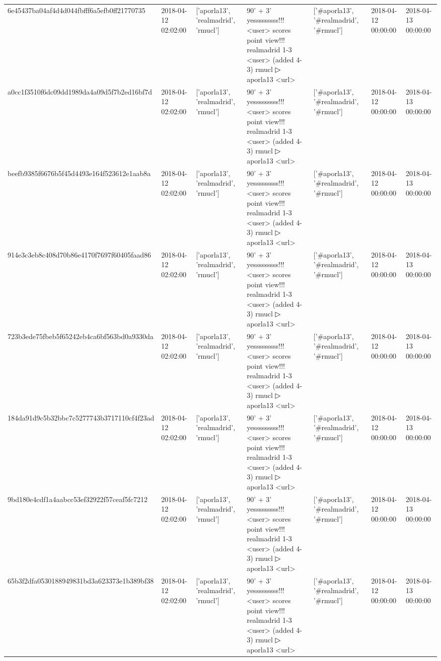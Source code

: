 \begin{tabular}{lllllll}
6e45437ba04af4d4d044fbfff6a5efb0ff21770735 & 2018-04-12 02:02:00 & ['aporla13', 'realmadrid', 'rmucl'] & 90' + 3' yesssssssss!!! <user> scores point view!!! realmadrid 1-3 <user> (added 4-3) rmucl ▷ aporla13 <url> & ['#aporla13', '#realmadrid', '#rmucl'] & 2018-04-12 00:00:00 & 2018-04-13 00:00:00 \\
a0cc1f3510f6dc09dd1989da4a09d5f7b2ed16bf7d & 2018-04-12 02:02:00 & ['aporla13', 'realmadrid', 'rmucl'] & 90' + 3' yesssssssss!!! <user> scores point view!!! realmadrid 1-3 <user> (added 4-3) rmucl ▷ aporla13 <url> & ['#aporla13', '#realmadrid', '#rmucl'] & 2018-04-12 00:00:00 & 2018-04-13 00:00:00 \\
beefb9385f6676b5f45d4493e164f523612e1aab8a & 2018-04-12 02:02:00 & ['aporla13', 'realmadrid', 'rmucl'] & 90' + 3' yesssssssss!!! <user> scores point view!!! realmadrid 1-3 <user> (added 4-3) rmucl ▷ aporla13 <url> & ['#aporla13', '#realmadrid', '#rmucl'] & 2018-04-12 00:00:00 & 2018-04-13 00:00:00 \\
914e3c3eb8c408d70b86e4170f7697f60405faad86 & 2018-04-12 02:02:00 & ['aporla13', 'realmadrid', 'rmucl'] & 90' + 3' yesssssssss!!! <user> scores point view!!! realmadrid 1-3 <user> (added 4-3) rmucl ▷ aporla13 <url> & ['#aporla13', '#realmadrid', '#rmucl'] & 2018-04-12 00:00:00 & 2018-04-13 00:00:00 \\
723b3ede75fbeb5f65242eb4ca6bf563bd0a9330da & 2018-04-12 02:02:00 & ['aporla13', 'realmadrid', 'rmucl'] & 90' + 3' yesssssssss!!! <user> scores point view!!! realmadrid 1-3 <user> (added 4-3) rmucl ▷ aporla13 <url> & ['#aporla13', '#realmadrid', '#rmucl'] & 2018-04-12 00:00:00 & 2018-04-13 00:00:00 \\
184da91d9c5b32bbc7c5277743b3717110cf4f23ad & 2018-04-12 02:02:00 & ['aporla13', 'realmadrid', 'rmucl'] & 90' + 3' yesssssssss!!! <user> scores point view!!! realmadrid 1-3 <user> (added 4-3) rmucl ▷ aporla13 <url> & ['#aporla13', '#realmadrid', '#rmucl'] & 2018-04-12 00:00:00 & 2018-04-13 00:00:00 \\
9bd180e4cdf1a4aabcc53ef32922f57ceaf5fc7212 & 2018-04-12 02:02:00 & ['aporla13', 'realmadrid', 'rmucl'] & 90' + 3' yesssssssss!!! <user> scores point view!!! realmadrid 1-3 <user> (added 4-3) rmucl ▷ aporla13 <url> & ['#aporla13', '#realmadrid', '#rmucl'] & 2018-04-12 00:00:00 & 2018-04-13 00:00:00 \\
65b3f2dfa0530188949831bd3a623373e1b389bf38 & 2018-04-12 02:02:00 & ['aporla13', 'realmadrid', 'rmucl'] & 90' + 3' yesssssssss!!! <user> scores point view!!! realmadrid 1-3 <user> (added 4-3) rmucl ▷ aporla13 <url> & ['#aporla13', '#realmadrid', '#rmucl'] & 2018-04-12 00:00:00 & 2018-04-13 00:00:00 \\

\end{tabular}
